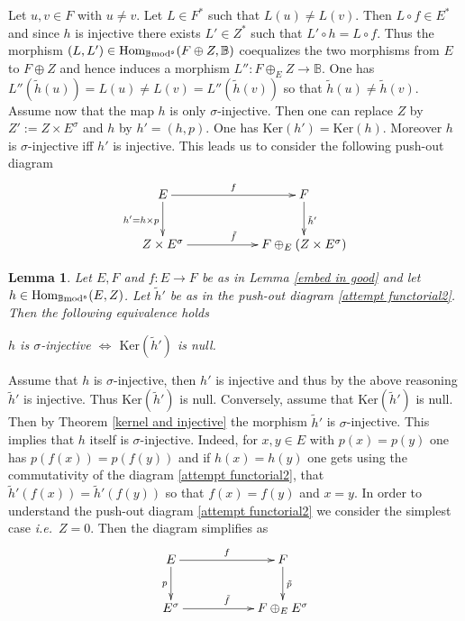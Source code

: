 \documentclass[12pt]{article}
\newtheorem{lem}[thm]{Lemma}
\def\Hom{{\rm Hom}}
\def\B{{\mathbb B}}
\newcommand{\ie}{{\it i.e.\/}\ }
\def\ker{{\mbox{Ker}}}
\def\Hom {{\mbox{Hom}}}
\def\b2{{\rm \B mod^{\mathfrak s}}}
\begin{document}
Let $u,v\in F$ with $u\neq v$. Let $L\in F^*$ such that $L(u)\neq L(v)$. Then $L\circ f\in E^*$ and since $ h$ is injective there exists $L'\in Z^*$ such that $L'\circ h=L\circ f$. Thus the morphism $(L,L')\in \Hom_\b2(F\oplus Z,\B)$ coequalizes the two morphisms from $E$ to $F\oplus Z$ and hence induces a morphism $L'':F\oplus_{E}Z\to \B$. One has $L''(\tilde h(u))=L(u)\neq L(v)=L''(\tilde h(v))$ so that $\tilde h(u)\neq \tilde h(v)$. Assume now that the map $h$ is only $\sigma$-injective. Then one can replace $Z$ by $Z':=Z \times E^\sigma$
and $h$ by $h'=(h,p)$. One has $\ker(h')=\ker(h)$. Moreover $h$ is  $\sigma$-injective iff $h'$ is injective. This leads us to consider the following push-out diagram
\begin{equation}\label{attempt functorial2}
\xymatrix@C=25pt@R=25pt{
 E \ar[d]_{h'=h\times p}\ar[rr]^{f} && F\ar[d]^{\tilde h'}
\\
 Z\times E^\sigma \ar[rr]^{\tilde f}&& F\oplus_{E}(Z\times E^\sigma)}
\end{equation}
\begin{lem}\label{embed in good bis}
	Let $E,F$ and $f:E\to F$ be as in Lemma \ref{embed in good} and let  $h\in \Hom_\b2(E,Z)$. Let $\tilde h'$ be as in the push-out diagram
\ref{attempt functorial2}. Then the following equivalence holds\vspace{.05in}

   \centerline{$h$  is $\sigma$-injective $\iff$ $\ker(\tilde h')$ is null.} 
\end{lem}
\proof Assume that $h$  is $\sigma$-injective, then $h'$ is injective and thus by the above reasoning $\tilde h'$ is injective. Thus $\ker(\tilde h')$ is null. Conversely, assume that $\ker(\tilde h')$ is null. Then by Theorem \ref{kernel and injective} the morphism $\tilde h'$ is $\sigma$-injective. This implies that $h$ itself is $\sigma$-injective. Indeed, for $x,y\in E$ with $p(x)=p(y)$ one has $p(f(x))=p(f(y))$ and if $h(x)=h(y)$ one gets using the commutativity of the diagram \eqref{attempt functorial2}, that 
$\tilde h'(f(x))=\tilde h'(f(y))$ so that $f(x)=f(y)$ and $x=y$.\endproof
In order to understand the push-out diagram \eqref{attempt functorial2} we consider the simplest case \ie $Z=0$. Then the diagram simplifies as
\begin{equation}\label{attempt functorial3}
\xymatrix@C=25pt@R=25pt{
 E \ar[d]_{ p}\ar[rr]^{f} && F\ar[d]^{\tilde p}
\\
  E^\sigma \ar[rr]^{\tilde f}&& F\oplus_{E} E^\sigma}
\end{equation} 
\end{document}
